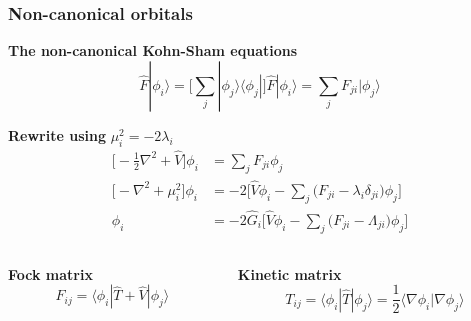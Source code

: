 \begin{frame}
    \frametitle{Non-canonical orbitals}
    \centering
    \textbf{The non-canonical Kohn-Sham equations}
    \begin{equation}
        \nonumber
        \hat{F}|\phi_i\rangle 
        = \bigg[\sum_j|\phi_j\rangle\langle\phi_j|\bigg]\hat{F}|\phi_i\rangle
        = \sum_jF_{ji}|\phi_j\rangle
    \end{equation}

    \vspace{5mm}

    \textbf{Rewrite using} $\mu_i^2 = -2\lambda_i$
    \begin{align}
        \nonumber
        \bigg[-\frac{1}{2}\nabla^2 + \hat{V}\bigg]\phi_i
        &= \sum_jF_{ji}\phi_j\\
        \nonumber
        \bigg[-\nabla^2 + \mu_i^2\bigg]\phi_i 
        &= -2\bigg[\hat{V}\phi_i - \sum_j\big(F_{ji} -
        \lambda_i\delta_{ji}\big)\phi_j\bigg]\\
        \nonumber
        \phi_i
        &= -2\hat{G}_i\bigg[\hat{V}\phi_i - \sum_j\big(F_{ji} -
        \Lambda_{ji}\big)\phi_j\bigg]
    \end{align}

    \vspace{5mm}

    \begin{columns}
    \begin{column}[b]{0.48\linewidth}
    \centering
    \textbf{Fock matrix}
    \begin{equation}
        \nonumber
        F_{ij} = \langle\phi_i|\hat{T} + \hat{V}|\phi_j\rangle
    \end{equation}
    \end{column}

    \begin{column}[b]{0.48\linewidth}
    \centering
    \textbf{Kinetic matrix}
    \begin{equation}
        \nonumber
        T_{ij}
        = \langle\phi_i|\hat{T}|\phi_j\rangle
        = \frac{1}{2}\langle\nabla\phi_i|\nabla\phi_j\rangle
    \end{equation}
    \end{column}
    \end{columns}
\end{frame}

